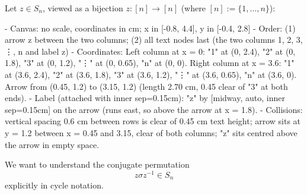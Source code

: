 \begin{content}
Let $z \in S_n$, viewed as a bijection $z \colon [n] \longrightarrow [n]$ (where $[n] := \{1, \dots, n\}$):
\begin{hidden}
- Canvas: no scale, coordinates in cm; x in [-0.8, 4.4], y in [-0.4, 2.8]
- Order: (1) arrow z between the two columns; (2) all text nodes last (the two columns 1, 2, 3, \vdots, n and label z)
- Coordinates:
  Left column at x = 0: "1" at (0, 2.4), "2" at (0, 1.8), "3" at (0, 1.2), "\vdots" at (0, 0.65), "n" at (0, 0).
  Right column at x = 3.6: "1" at (3.6, 2.4), "2" at (3.6, 1.8), "3" at (3.6, 1.2), "\vdots" at (3.6, 0.65), "n" at (3.6, 0).
  Arrow from (0.45, 1.2) to (3.15, 1.2) (length 2.70 cm, 0.45 clear of "3" at both ends).
- Label (attached with inner sep=0.15cm): "z" by [midway, auto, inner sep=0.15cm] on the arrow (runs east, so above the arrow at x = 1.8).
- Collisions: vertical spacing 0.6 cm between rows is clear of 0.45 cm text height; arrow sits at y = 1.2 between x = 0.45 and 3.15, clear of both columns; "z" sits centred above the arrow in empty space.
\end{hidden}
\begin{center}
\end{center}
We want to understand the conjugate permutation
\begin{equation}\label{eq:conjugate-perm-def}
z \sigma z^{-1} \in S_n
\end{equation}
explicitly in cycle notation.
\end{content}

